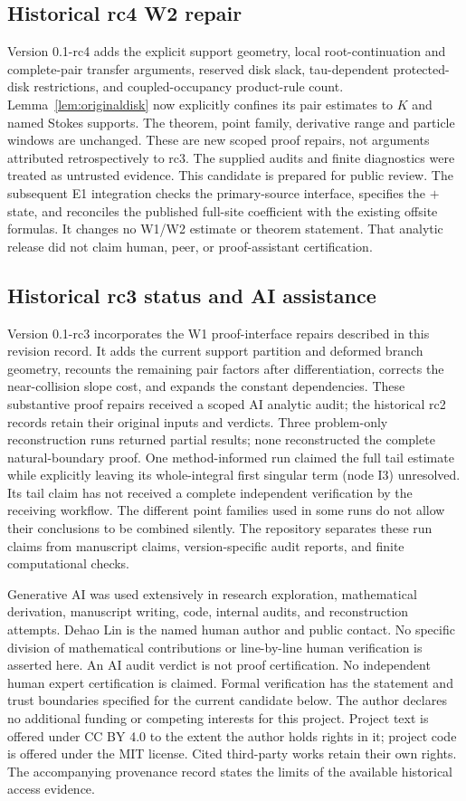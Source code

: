 \subsection*{Historical rc4 W2 repair}
Version 0.1-rc4 adds the explicit support geometry,
local root-continuation and complete-pair transfer arguments,
reserved disk slack, tau-dependent protected-disk restrictions,
and coupled-occupancy product-rule count. Lemma~\ref{lem:originaldisk}
now explicitly confines its pair estimates to \(K\) and named
Stokes supports. The theorem, point family, derivative range and
particle windows are unchanged. These are new scoped proof repairs,
not arguments attributed retrospectively to rc3. The supplied
audits and finite diagnostics were treated as untrusted evidence.
This candidate is prepared for public review. The subsequent E1 integration
checks the primary-source interface, specifies the \(+\) state, and
reconciles the published full-site coefficient with the existing
offsite formulas. It changes no W1/W2 estimate or theorem statement.
That analytic release did not claim human, peer, or proof-assistant certification.

\subsection*{Historical rc3 status and AI assistance}
Version 0.1-rc3 incorporates the W1 proof-interface repairs described in this revision record.
It adds the current support partition and deformed branch geometry,
recounts the remaining pair factors after differentiation, corrects
the near-collision slope cost, and expands the constant dependencies.
These substantive proof repairs received a scoped AI analytic audit;
the historical rc2 records retain their original inputs and verdicts.
Three problem-only reconstruction runs returned partial results;
none reconstructed the complete natural-boundary proof. One
method-informed run claimed the full tail estimate while explicitly
leaving its whole-integral first singular term (node I3) unresolved.
Its tail claim has not received a complete independent verification
by the receiving workflow. The different point families used in
some runs do not allow their conclusions to be combined silently.
The repository separates these run claims from manuscript claims,
version-specific audit reports, and finite computational checks.

Generative AI was used extensively in research exploration,
mathematical derivation, manuscript writing, code, internal audits,
and reconstruction attempts. Dehao Lin is the named human author
and public contact. No specific division of mathematical contributions
or line-by-line human verification is asserted here.
An AI audit verdict is not proof certification. No independent human
expert certification is claimed. Formal verification has the statement
and trust boundaries specified for the current candidate below.
The author declares no additional funding or competing interests
for this project. Project text is offered under CC BY 4.0 to the extent
the author holds rights in it; project code is offered under the MIT
license. Cited third-party works retain their own rights.
The accompanying provenance record states
the limits of the available historical access evidence.

